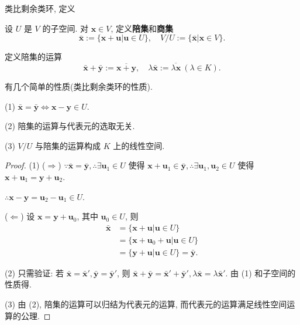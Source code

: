 \documentclass{ctexart}
\begin{document}
类比剩余类环, 定义
\begin{definition}
    设 $U$ 是 $V$ 的子空间. 对 $\boldsymbol{x}\in V$, 定义\textbf{陪集}和\textbf{商集}
    \[\bar{\boldsymbol{x}}:=\{\boldsymbol{x}+\boldsymbol{u}|\boldsymbol{u}\in U\},\quad V/U:=\{\bar{\boldsymbol{x}}|\boldsymbol{x}\in V\}.\]

    定义陪集的运算
    \[\bar{\boldsymbol{x}}+\bar{\boldsymbol{y}}:=\overline{\boldsymbol{x}+\boldsymbol{y}},\quad\lambda\bar{\boldsymbol{x}}:=\overline{\lambda\boldsymbol{x}}\ (\lambda\in K).\]
\end{definition}
有几个简单的性质(类比剩余类环的性质).
\begin{property}\label{p1.3}
    (1) $\bar{\boldsymbol{x}}=\bar{\boldsymbol{y}}\Leftrightarrow\boldsymbol{x}-\boldsymbol{y}\in U$.

    (2) 陪集的运算与代表元的选取无关.

    (3) $V/U$ 与陪集的运算构成 $K$ 上的线性空间.
\end{property}
\begin{proof}
    (1) ($\Rightarrow$) $\because\bar{\boldsymbol{x}}=\bar{\boldsymbol{y}},\therefore\exists\boldsymbol{u}_1\in U$ 使得 $\boldsymbol{x}+\boldsymbol{u}_1\in\bar{\boldsymbol{y}},\therefore\exists\boldsymbol{u}_1,\boldsymbol{u}_2\in U$ 使得 $\boldsymbol{x}+\boldsymbol{u}_1=\boldsymbol{y}+\boldsymbol{u}_2$.

    $\therefore\boldsymbol{x}-\boldsymbol{y}=\boldsymbol{u}_2-\boldsymbol{u}_1\in U$.

    ($\Leftarrow$) 设 $\boldsymbol{x}=\boldsymbol{y}+\boldsymbol{u}_0$, 其中 $\boldsymbol{u}_0\in U$, 则
    \begin{align*}
        \bar{\boldsymbol{x}} & =\{\boldsymbol{x}+\boldsymbol{u}|\boldsymbol{u}\in U\} \\
        & =\{\boldsymbol{x}+\boldsymbol{u}_0+\boldsymbol{u}|\boldsymbol{u}\in U\} \\
        & =\{\boldsymbol{y}+\boldsymbol{u}|\boldsymbol{u}\in U\}=\bar{\boldsymbol{y}}.
    \end{align*}

    (2) 只需验证: 若 $\bar{\boldsymbol{x}}=\bar{\boldsymbol{x}}',\bar{\boldsymbol{y}}=\bar{\boldsymbol{y}}'$, 则 $\bar{\boldsymbol{x}}+\bar{\boldsymbol{y}}=\bar{\boldsymbol{x}}'+\bar{\boldsymbol{y}}',\lambda\bar{\boldsymbol{x}}=\lambda\bar{\boldsymbol{x}}'$. 由 (1) 和子空间的性质得.

    (3) 由 (2), 陪集的运算可以归结为代表元的运算, 而代表元的运算满足线性空间运算的公理.
\end{proof}
\end{document}
